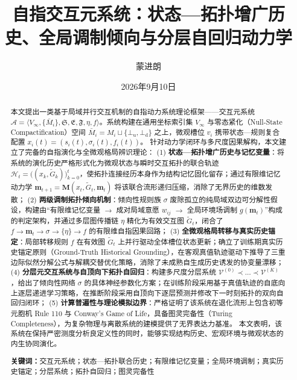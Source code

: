 \documentclass[11pt,a4paper]{article}
\title{\bfseries 自指交互元系统：状态—拓扑增广历史、全局调制倾向与分层自回归动力学}
\author{蒙进朗}
\date{2026年9月10日}
\numberwithin{equation}{section}
\theoremstyle{definition}
\theoremstyle{remark}
\begin{document}
	
	\maketitle
	
	\begin{abstract}
		本文提出一类基于局域并行交互机制的自指动力系统理论框架——交互元系统 $\mathcal{A}=\langle V_\infty,\{\bar{M}_i\},\mathfrak{S},\mathfrak{E},\mathfrak{F},\eta,f\rangle$。系统构建在通用坐标索引集 $V_\infty$ 与零态紧化（Null-State Compactification）空间 $\bar{M}_i = M_i \sqcup \{\bot_{\mathrm{u}}, \bot_{\mathrm{d}}\}$ 之上，微观槽位 $v_i$ 携带状态—规则复合配置 $x_i(t)=(s_i(t),\sigma_i(t),f_i(t))$。
		针对动力学闭环与多尺度因果解构，本文建立了完备的自指演化与全微观格局辨识理论：
		(1) \textbf{状态—拓扑增广历史与记忆变量}：将系统的演化历史严格形式化为微观状态与瞬时交互拓扑的联合轨迹 $\mathcal{H}_t = \big( (x_k, \widetilde{G}_k) \big)_{k=0}^t$，使拓扑连接经历本身作为结构记忆固化留存；通过有限维记忆动力学 $\mathbf{m}_{t+1} = \mathbf{M}(x_t, \widetilde{G}_t, \mathbf{m}_t)$ 将该联合流形递归压缩，消除了无界历史的维数发散；
		(2) \textbf{两级调制拓扑倾向机制}：倾向性规则族 $\sigma$ 废除孤立的纯局域双边可分解性假设，构建由“有限维记忆变量 $\to$ 成对局域意愿 $w_{ij}$ $\to$ 全局环境场调制 $g(\mathbf{m}_t)$”构成的判定架构，并通过多层图传播链 $\eta$ 精化为有效交互图 $\widetilde{G}_t$，闭合了 $f \to \mathbf{m}_t \to \sigma \to \{\eta\} \to f$ 的有限维自指因果回路；
		(3) \textbf{全微观格局转移与真实历史锚定}：局部转移规则 $f$ 在有效图 $\widetilde{G}_t$ 上并行驱动全体槽位状态更新；确立了训练期真实历史锚定原则（Ground-Truth Historical Grounding），在客观真值轨迹驱动下推导了三重边际似然分解公式与解耦交替优化策略，消除了未成熟自生成历史诱发的协变量漂移；
		(4) \textbf{分层元交互系统与自顶向下拓扑自回归}：构建多尺度分层系统 $\mathcal{V}^{(0)} \prec \dots \prec \mathcal{V}^{(K)}$，给出了倾向性网络 $\sigma$ 的具体神经参数化方案；在训练阶段采用基于真值轨迹的自底向上逐层递进学习策略，在推断阶段采用自顶向下逐层预测并修改下一时刻拓扑的双向自回归闭环；
		(5) \textbf{计算普遍性与理论模拟边界}：严格证明了该系统在退化流形上包含初等元胞机 Rule 110 与 Conway's Game of Life，具备图灵完备性（Turing Completeness），为复杂物理与离散系统的建模提供了无界表达力基准。
		本文表明，该系统在保持严密测度分析良定义性的同时，能够实现结构历史、宏观环境与微观状态的内生协同演化。
		\par\medskip
		\noindent\textbf{关键词：}交互元系统；状态—拓扑联合历史；有限维记忆变量；全局环境调制；真实历史锚定；分层系统；拓扑自回归；图灵完备性
	\end{abstract}
	
\end{document}
